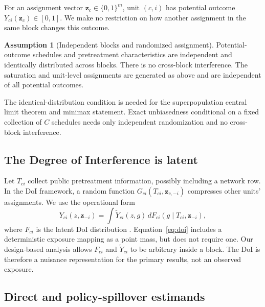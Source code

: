 \documentclass[11pt]{article}
\theoremstyle{definition}
\newtheorem{assumption}[theorem]{Assumption}
\theoremstyle{remark}
\begin{document}
For an assignment vector $\mathbf z_c\in\{0,1\}^m$, unit $(c,i)$ has potential outcome
$Y_{ci}(\mathbf z_c)\in[0,1]$. We make no restriction on how another assignment in the same
block changes this outcome.

\begin{assumption}[Independent blocks and randomized assignment]
\label{ass:block}
Potential-outcome schedules and pretreatment characteristics are independent and identically
distributed across blocks. There is no cross-block interference. The saturation and unit-level
assignments are generated as above and are independent of all potential outcomes.
\end{assumption}

The identical-distribution condition is needed for the superpopulation central limit theorem
and minimax statement. Exact unbiasedness conditional on a fixed collection of $C$ schedules
needs only independent randomization and no cross-block interference.

\subsection{The Degree of Interference is latent}

Let $T_{ci}$ collect public pretreatment information, possibly including a network row. In the
DoI framework, a random function $G_{ci}(T_{ci},\mathbf z_{c,-i})$ compresses other units'
assignments. We use the operational form
\begin{equation}
  Y_{ci}(z,\mathbf z_{-i})
  = \int \widetilde Y_{ci}(z,g)\,
      dF_{ci}(g\mid T_{ci},\mathbf z_{-i}),
  \label{eq:doi}
\end{equation}
where $F_{ci}$ is the latent DoI distribution
\citep{OhnishiKarmakarSabbaghi2025}. Equation~\eqref{eq:doi} includes a deterministic exposure
mapping as a point mass, but does not require one. Our design-based analysis allows
$F_{ci}$ and $\widetilde Y_{ci}$ to be arbitrary inside a block. The DoI is therefore a nuisance
representation for the primary results, not an observed exposure.

\subsection{Direct and policy-spillover estimands}
\end{document}
